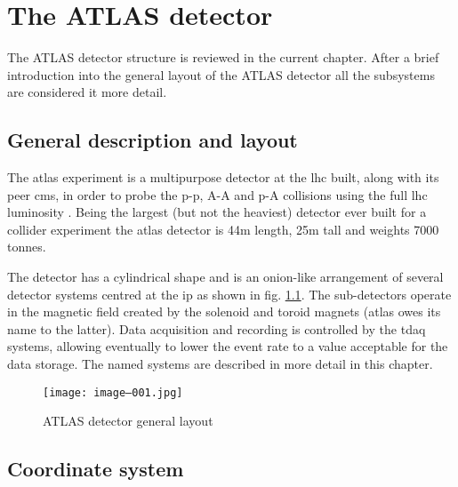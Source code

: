 \chapter{The ATLAS detector}
	The ATLAS detector structure is reviewed in the current chapter. After a brief introduction into the general layout of the ATLAS detector all the subsystems are considered it more detail.
       \section{General description and layout}
    
        The \gls{atlas} experiment is a multipurpose detector at the \gls{lhc} built, along with its peer \gls{cms}, in order to probe the p-p, A-A and p-A collisions using the full \gls{lhc} luminosity \cite{atlas_experiment}. Being the largest (but not the heaviest) detector ever built for a collider experiment the \gls{atlas} detector is 44m length, 25m tall and weights 7000 tonnes. 
        
        The detector has a cylindrical shape and is an onion-like arrangement of several detector systems centred at the \gls{ip} as shown in fig. \ref{fig::atlas_layout}. The sub-detectors operate in the magnetic field created by the solenoid and toroid magnets (\gls{atlas} owes its name to the latter). Data acquisition and recording is controlled by the \gls{tdaq} systems, allowing eventually to lower the event rate to a value acceptable for the data storage. The named systems are described in more detail in this chapter.
        
        
        \begin{figure}[htpb]
        		\texttt{[image: image--001.jpg]}
        		\caption{ ATLAS detector general layout}
        		\label{fig::atlas_layout}
        \end{figure}
        
        \section{Coordinate system}
        
